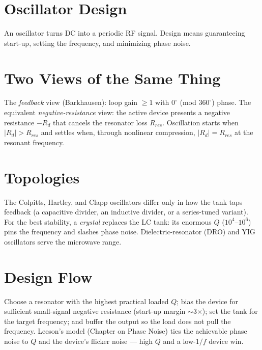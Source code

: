 \section{Oscillator Design}\label{sec:tb_oscdesign}



An oscillator turns DC into a periodic RF signal. Design means guaranteeing
start-up, setting the frequency, and minimizing phase noise.

\section{Two Views of the Same Thing}
The \emph{feedback} view (Barkhausen): loop gain $\ge 1$ with $0^\circ$ (mod
$360^\circ$) phase. The equivalent \emph{negative-resistance} view: the active
device presents a negative resistance $-R_d$ that cancels the resonator loss
$R_{res}$. Oscillation starts when $|R_d| > R_{res}$ and settles when, through
nonlinear compression, $|R_d| = R_{res}$ at the resonant frequency.

\section{Topologies}
The Colpitts, Hartley, and Clapp oscillators differ only in how the tank taps
feedback (a capacitive divider, an inductive divider, or a series-tuned
variant). For the best stability, a \emph{crystal} replaces the LC tank: its
enormous $Q$ ($10^4$--$10^6$) pins the frequency and slashes phase noise.
Dielectric-resonator (DRO) and YIG oscillators serve the microwave range.

\section{Design Flow}
Choose a resonator with the highest practical loaded $Q$; bias the device for
sufficient small-signal negative resistance (start-up margin $\sim$3$\times$);
set the tank for the target frequency; and buffer the output so the load does not
pull the frequency. Leeson's model (Chapter on Phase Noise) ties the achievable
phase noise to $Q$ and the device's flicker noise --- high $Q$ and a low-$1/f$
device win.



